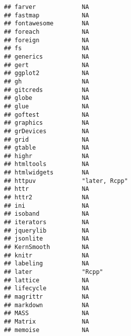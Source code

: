 \documentclass[
]{article}
\begin{document}
\begin{verbatim}
## farver             NA                                        
## fastmap            NA                                        
## fontawesome        NA                                        
## foreach            NA                                        
## foreign            NA                                        
## fs                 NA                                        
## generics           NA                                        
## gert               NA                                        
## ggplot2            NA                                        
## gh                 NA                                        
## gitcreds           NA                                        
## globe              NA                                        
## glue               NA                                        
## goftest            NA                                        
## graphics           NA                                        
## grDevices          NA                                        
## grid               NA                                        
## gtable             NA                                        
## highr              NA                                        
## htmltools          NA                                        
## htmlwidgets        NA                                        
## httpuv             "later, Rcpp"                             
## httr               NA                                        
## httr2              NA                                        
## ini                NA                                        
## isoband            NA                                        
## iterators          NA                                        
## jquerylib          NA                                        
## jsonlite           NA                                        
## KernSmooth         NA                                        
## knitr              NA                                        
## labeling           NA                                        
## later              "Rcpp"                                    
## lattice            NA                                        
## lifecycle          NA                                        
## magrittr           NA                                        
## markdown           NA                                        
## MASS               NA                                        
## Matrix             NA                                        
## memoise            NA                                        

\end{verbatim}
\end{document}
